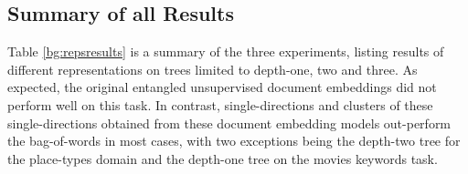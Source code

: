 
	





\subsection{Summary of all Results}

 Table \ref{bg:repsresults} is a summary of the three experiments, listing results of different representations on trees limited to depth-one, two and three. As expected, the original entangled unsupervised document embeddings did not perform well on this task. In contrast, single-directions and clusters of these single-directions obtained from these document embedding models out-perform the bag-of-words in most cases, with two exceptions being the depth-two tree for the place-types domain and the depth-one tree on the movies keywords task. 

